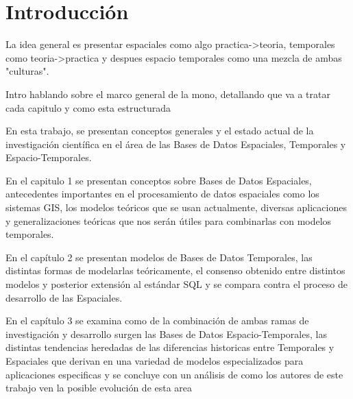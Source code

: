 \usepackage[utf8]{inputenc}
\chapter{Introducción} \label{cap:intro}

La idea general es presentar espaciales como algo practica->teoria, temporales como teoria->practica y despues espacio temporales como una mezcla de ambas "culturas".

Intro hablando sobre el marco general de la mono, detallando que va a tratar cada capitulo y como esta estructurada

En esta trabajo, se presentan conceptos generales y el estado actual de la investigación científica en el área de las Bases de Datos Espaciales, Temporales y Espacio-Temporales.

En el capitulo 1 se presentan conceptos sobre Bases de Datos Espaciales, antecedentes importantes en el procesamiento de datos espaciales como los sistemas GIS, los modelos teóricos que se usan actualmente, diversas aplicaciones y generalizaciones teóricas que nos serán útiles para combinarlas con modelos temporales.

En el capítulo 2 se presentan modelos de Bases de Datos Temporales, las distintas formas de modelarlas teóricamente, el consenso obtenido entre distintos modelos y posterior extensión al estándar SQL y se compara contra el proceso de desarrollo de las Espaciales.

En el capítulo 3 se examina como de la combinación de ambas ramas de investigación y desarrollo surgen las Bases de Datos Espacio-Temporales, las distintas tendencias heredadas de las diferencias historicas entre Temporales y Espaciales que derivan en una variedad de modelos especializados para aplicaciones especificas y se concluye con un análisis de como los autores de este trabajo ven la posible evolución de esta area